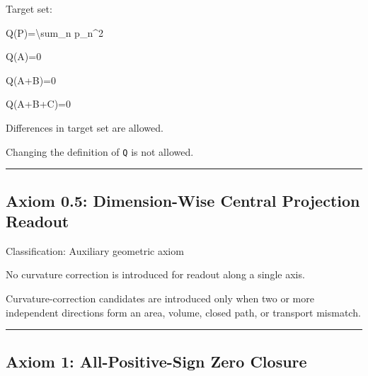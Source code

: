 \documentclass[
  a4paper,
]{article}
\newenvironment{Shaded}{}{}
\newcommand{\NormalTok}[1]{#1}
\begin{document}
Target set:

\begin{Shaded}
\begin{Highlighting}[]
\NormalTok{Q(P)=\textbackslash{}sum\_n p\_n\^{}2}
\end{Highlighting}
\end{Shaded}

\begin{Shaded}
\begin{Highlighting}[]
\NormalTok{Q(A)=0}
\end{Highlighting}
\end{Shaded}

\begin{Shaded}
\begin{Highlighting}[]
\NormalTok{Q(A+B)=0}
\end{Highlighting}
\end{Shaded}

\begin{Shaded}
\begin{Highlighting}[]
\NormalTok{Q(A+B+C)=0}
\end{Highlighting}
\end{Shaded}

Differences in target set are allowed.

Changing the definition of \texttt{Q} is not allowed.

\begin{center}\rule{0.5\linewidth}{0.5pt}\end{center}

\subsection{Axiom 0.5: Dimension-Wise Central Projection
Readout}\label{axiom-0.5-dimension-wise-central-projection-readout}

Classification: Auxiliary geometric axiom

No curvature correction is introduced for readout along a single axis.

Curvature-correction candidates are introduced only when two or more
independent directions form an area, volume, closed path, or transport
mismatch.

\begin{center}\rule{0.5\linewidth}{0.5pt}\end{center}

\subsection{Axiom 1: All-Positive-Sign Zero
Closure}\label{axiom-1-all-positive-sign-zero-closure}
\end{document}
